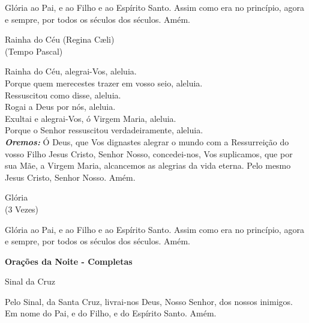 \documentclass{book}
\begin{document}
\begin{flushleft}
    Glória ao Pai, e ao Filho e ao Espírito Santo. Assim como era no princípio, agora e sempre, por todos os séculos dos séculos. Amém.
\end{flushleft}
\newpage
\begin{center}
    Rainha do Céu (Regina Cæli) \\ \textcolor{VioletRed2}{\scriptsize{(Tempo Pascal)}}
\end{center}
\begin{flushleft}
    \VbarRed{} Rainha do Céu, alegrai-Vos, aleluia. \\
    \RbarRed{} Porque quem merecestes trazer em vosso seio, aleluia. \\
    \VbarRed{} Ressuscitou como disse, aleluia. \\
    \RbarRed{} Rogai a Deus por nós, aleluia.
    \vspace{.2cm} \\
    \VbarRed{} Exultai e alegrai-Vos, ó Virgem Maria, aleluia. \\
    \RbarRed{} Porque o Senhor ressuscitou verdadeiramente, aleluia.
    \vspace{.2cm} \\
    \textbf{\textit{Oremos:}} Ó Deus, que Vos dignastes alegrar o mundo com a Ressurreição do vosso Filho Jesus Cristo, Senhor Nosso, concedei-nos, Vos suplicamos, que por sua Mãe, a Virgem Maria, alcancemos as alegrias da vida eterna. Pelo mesmo Jesus Cristo, Senhor Nosso. Amém.
\end{flushleft}
\begin{center}
    Glória \\ \textcolor{VioletRed2}{\scriptsize{(3 Vezes)}}
\end{center}
\begin{flushleft}
    Glória ao Pai, e ao Filho e ao Espírito Santo. Assim como era no princípio, agora e sempre, por todos os séculos dos séculos. Amém.
\end{flushleft}
\newpage
\begin{center}
    \textbf{Orações da Noite - Completas}
\end{center}
\begin{center}
    Sinal da Cruz
\end{center}
\begin{flushleft}
    Pelo Sinal, \grecrossRed{} da Santa Cruz, livrai-nos Deus, \grecrossRed{} Nosso Senhor, dos nossos \grecrossRed{} inimigos. Em nome do Pai, \grecrossRed{} e do Filho, e do Espírito Santo. Amém.
\end{flushleft}
\end{document}
